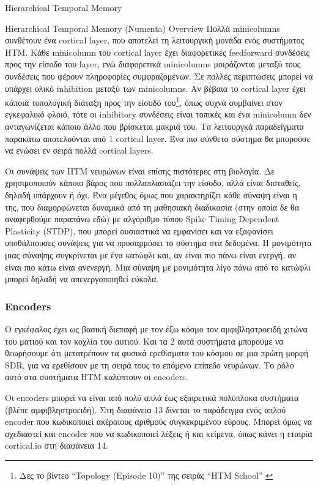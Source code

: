 \documentclass[a4paper,11pt]{article}
\renewcommand{\emph}[1]{\textcolor{blue}{\oldemph{#1}}}
\begin{document}
\begin{section}{Hierarchical Temporal Memory}
\begin{subsection}{Hierarchical Temporal Memory (Numenta) Overview}
	Πολλά minicolumns συνθέτουν ένα cortical layer, που αποτελεί τη λειτουργική μονάδα ενός συστήματος HTM. Κάθε minicolumn του cortical layer έχει διαφορετικές feedforward συνδέσεις προς την είσοδο του layer, ενώ διαφορετικά minicolumns μοιράζονται μεταξύ τους συνδέσεις που φέρουν πληροφορίες συμφραζομένων. Σε πολλές περιπτώσεις μπορεί να υπάρχει ολικό inhibition μεταξύ των minicolumns. Αν βέβαια το cortical layer έχει κάποια τοπολογική διάταξη προς την είσοδό του\footnote{Δες το βίντεο ``Topology (Episode 10)'' της σειράς ``HTM School'' \cite{htmschool}}, όπως συχνά συμβαίνει στον εγκεφαλικό φλοιό, τότε οι inhibitory συνδέσεις είναι τοπικές και ένα minicolumn δεν ανταγωνίζεται κάποιο άλλο που βρίσκεται μακριά του.
	Τα λειτουργκά παραδείγματα παρακάτω αποτελούνται από 1 cortical layer. Ένα πιο σύνθετο σύστημα θα μπορούσε να ενώσει εν σειρά πολλά cortical layers.

	Οι συνάψεις των HTM νευρώνων είναι επίσης πιστότερες στη βιολογία. Δε χρησιμοποιούν κάποιο βάρος που πολλαπλασιάζει την είσοδο, αλλά είναι δισταθείς, δηλαδή υπάρχουν ή όχι. Ένα μέγεθος όμως που χαρακτηρίζει κάθε σύναψη είναι η \emph{μονιμότητά} της, που διαμορφώνεται δυναμικά από τη μαθησιακή διαδικασία (στην οποία δε θα αναφερθούμε παραπάνω εδώ) με αλγόριθμο τύπου Spike Timing Dependent Plasticity (STDP), που μπορεί ουσιαστικά να εμφανίσει και να εξαφανίσει υποθάλπουσες συνάψεις για να προσαρμόσει το σύστημα στα δεδομένα. Η μονιμότητα μιας σύναψης συγκρίνεται με ένα κατώφλι και, αν είναι πιο πάνω είναι ενεργή, αν είναι πιο κάτω είναι ανενεργή. Μια σύναψη με μονιμότητα λίγο πάνω από το κατώφλι μπορεί δηλαδή να απενεργοποιηθεί εύκολα.

	\subsubsection{Encoders}
	Ο εγκέφαλος έχει ως βασική διεπαφή με τον έξω κόσμο τον αμφιβληστροειδή χιτώνα του ματιού και τον κοχλία του αυτιού. Και τα 2 αυτά συστήματα μπορούμε να θεωρήσουμε ότι μετατρέπουν τα φυσικά ερεθίσματα του κόσμου σε μια πρώτη μορφή SDR, για να ερεθίσουν με τη σειρά τους το επόμενο επίπεδο νευρώνων. Το ρόλο αυτό στα συστήματα HTM καλύπτουν οι encoders.

	Οι encoders μπορεί να είναι από πολύ απλά έως εξαιρετικά πολύπλοκα συστήματα (βλέπε αμφιβληστροειδή). Στη διαφάνεια 13 δίνεται το παράδειγμα ενός απλού encoder που κωδικοποιεί ακέραιους αριθμούς συγκεκριμένου εύρους. Μπορεί όμως να σχεδιαστεί και encoder που να κωδικοποιεί λέξεις ή και κείμενα, όπως κάνει η εταιρία cortical.io \cite{semantic} στη διαφάνεια 14.
  \end{subsection}


\end{section}
\end{document}
